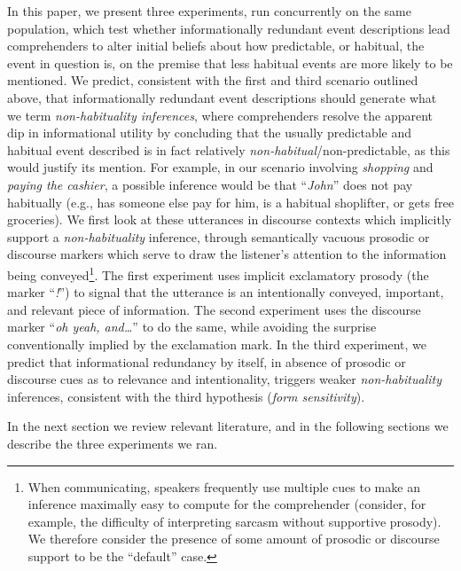 In this paper, we present three experiments, run concurrently on the
same population, which test whether informationally redundant event
descriptions lead comprehenders to alter initial beliefs about how
predictable, or habitual, the event in question is, on the premise that
less habitual events are more likely to be mentioned. We predict,
consistent with the first and third scenario outlined above, that
informationally redundant event descriptions should generate what we
term \emph{non-habituality inferences}, where comprehenders resolve the
apparent dip in informational utility by concluding that the usually
predictable and habitual event described is in fact relatively
\emph{non-habitual}/non-predictable, as this would justify its mention.
For example, in our scenario involving \emph{shopping} and \emph{paying
the cashier}, a possible inference would be that \enquote{\emph{John}}
does not pay habitually (e.g., has someone else pay for him, is a
habitual shoplifter, or gets free groceries). We first look at these
utterances in discourse contexts which implicitly support a
\emph{non-habituality} inference, through semantically vacuous prosodic
or discourse markers which serve to draw the listener's attention to the
information being conveyed\footnote{When communicating, speakers
  frequently use multiple cues to make an inference maximally easy to
  compute for the comprehender (consider, for example, the difficulty of
  interpreting sarcasm without supportive prosody). We therefore
  consider the presence of some amount of prosodic or discourse support
  to be the \enquote{default} case.}. The first experiment uses implicit
exclamatory prosody (the marker \enquote{\emph{!}}) to signal that the
utterance is an intentionally conveyed, important, and relevant piece of
information. The second experiment uses the discourse marker
\enquote{\emph{oh yeah, and\ldots{}}} to do the same, while avoiding the
surprise conventionally implied by the exclamation mark. In the third
experiment, we predict that informational redundancy by itself, in
absence of prosodic or discourse cues as to relevance and
intentionality, triggers weaker \emph{non-habituality} inferences,
consistent with the third hypothesis (\emph{form sensitivity}).

In the next section we review relevant literature, and in the following
sections we describe the three experiments we ran.
